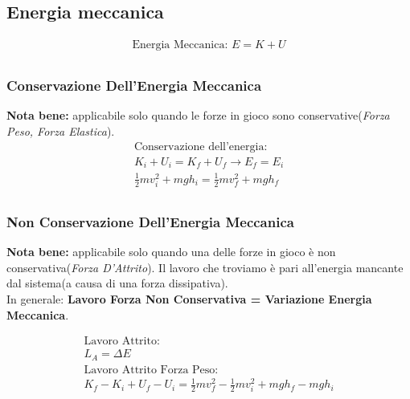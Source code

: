 \subsection{Energia meccanica}

\begin{gather*}
    \text{Energia Meccanica: } E = K + U \\
\end{gather*}
\subsubsection{Conservazione Dell'Energia Meccanica}
\textbf{Nota bene: } applicabile solo quando le forze in gioco sono conservative(\textit{Forza Peso, Forza Elastica}).
\begin{gather*}
    \text{Conservazione dell'energia: } \\ K_i + U_i = K_f + U_f \rightarrow E_f = E_i \\ \frac{1}{2} m v_i^2 + mgh_i = \frac{1}{2} mv_f^2 + mgh_f \\
\end{gather*}

\subsubsection{Non Conservazione Dell'Energia Meccanica}

\textbf{Nota bene: } applicabile solo quando una delle forze in gioco è non conservativa(\textit{Forza D'Attrito}). Il lavoro che troviamo è pari all'energia mancante dal sistema(a causa di una forza dissipativa). \\
In generale: \textbf{Lavoro Forza Non Conservativa = Variazione Energia Meccanica}.

\begin{gather*}
    \text{Lavoro Attrito: } \\ L_A = \Delta E \\
    \text{Lavoro Attrito Forza Peso: } \\ K_f - K_i + U_f - U_i = \frac{1}{2} m v_f^2 - \frac{1}{2} m v_i^2 + mgh_f - mgh_i
\end{gather*}